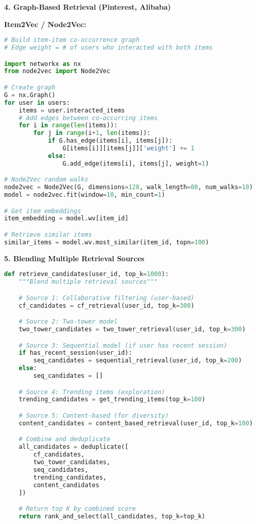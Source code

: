 \documentclass[10pt]{article}
\begin{document}
\textbf{4. Graph-Based Retrieval (Pinterest, Alibaba)}

\textbf{Item2Vec / Node2Vec:}
\begin{lstlisting}[language=Python]
# Build item-item co-occurrence graph
# Edge weight = # of users who interacted with both items

import networkx as nx
from node2vec import Node2Vec

# Create graph
G = nx.Graph()
for user in users:
    items = user.interacted_items
    # Add edges between co-occurring items
    for i in range(len(items)):
        for j in range(i+1, len(items)):
            if G.has_edge(items[i], items[j]):
                G[items[i]][items[j]]['weight'] += 1
            else:
                G.add_edge(items[i], items[j], weight=1)

# Node2Vec random walks
node2vec = Node2Vec(G, dimensions=128, walk_length=80, num_walks=10)
model = node2vec.fit(window=10, min_count=1)

# Get item embeddings
item_embedding = model.wv[item_id]

# Retrieve similar items
similar_items = model.wv.most_similar(item_id, topn=100)
\end{lstlisting}

\textbf{5. Blending Multiple Retrieval Sources}

\begin{lstlisting}[language=Python]
def retrieve_candidates(user_id, top_k=1000):
    """Blend multiple retrieval sources"""

    # Source 1: Collaborative filtering (user-based)
    cf_candidates = cf_retrieval(user_id, top_k=300)

    # Source 2: Two-tower model
    two_tower_candidates = two_tower_retrieval(user_id, top_k=300)

    # Source 3: Sequential model (if user has recent session)
    if has_recent_session(user_id):
        seq_candidates = sequential_retrieval(user_id, top_k=200)
    else:
        seq_candidates = []

    # Source 4: Trending items (exploration)
    trending_candidates = get_trending_items(top_k=100)

    # Source 5: Content-based (for diversity)
    content_candidates = content_based_retrieval(user_id, top_k=100)

    # Combine and deduplicate
    all_candidates = deduplicate([
        cf_candidates,
        two_tower_candidates,
        seq_candidates,
        trending_candidates,
        content_candidates
    ])

    # Return top K by combined score
    return rank_and_select(all_candidates, top_k=top_k)
\end{lstlisting}
\end{document}
